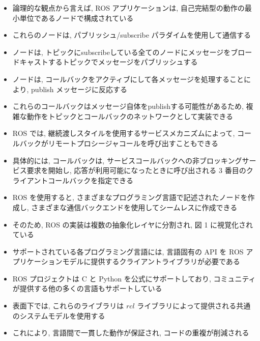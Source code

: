 \begin{frame}{}
    \begin{itemize}
        \item 論理的な観点から言えば, ROS アプリケーションは, 自己完結型の動作の最小単位であるノードで構成されている
        \item これらのノードは, パブリッシュ/subscribe パラダイムを使用して通信する
        \item ノードは, トピックにsubscribeしている全てのノードにメッセージをブロードキャストするトピックでメッセージをパブリッシュする
        \item ノードは, コールバックをアクティブにして各メッセージを処理することにより, publish メッセージに反応する
        \item これらのコールバックはメッセージ自体をpublishする可能性があるため, 複雑な動作をトピックとコールバックのネットワークとして実装できる
    \end{itemize}
\end{frame}

\begin{frame}{}
    \begin{itemize}
        \item  ROS では, 継続渡しスタイルを使用するサービスメカニズムによって, コールバックがリモートプロシージャコールを呼び出すこともできる
        \item 具体的には, コールバックは, サービスコールバックへの非ブロッキングサービス要求を開始し, 応答が利用可能になったときに呼び出される 3 番目のクライアントコールバックを指定できる
    \end{itemize}
\end{frame}

\begin{frame}{}
    \begin{itemize}
        \item ROS を使用すると, さまざまなプログラミング言語で記述されたノードを作成し, さまざまな通信バックエンドを使用してシームレスに作成できる
        \item そのため, ROS の実装は複数の抽象化レイヤに分割され, 図 1 に視覚化されている
        \item サポートされている各プログラミング言語には, 言語固有の API を ROS アプリケーションモデルに提供するクライアントライブラリが必要である
        \item ROS プロジェクトは C と Python を公式にサポートしており, コミュニティが提供する他の多くの言語もサポートしている
        \item 表面下では, これらのライブラリは $r c l$ ライブラリによって提供される共通のシステムモデルを使用する
        \item これにより, 言語間で一貫した動作が保証され, コードの重複が削減される
    \end{itemize}
\end{frame}

